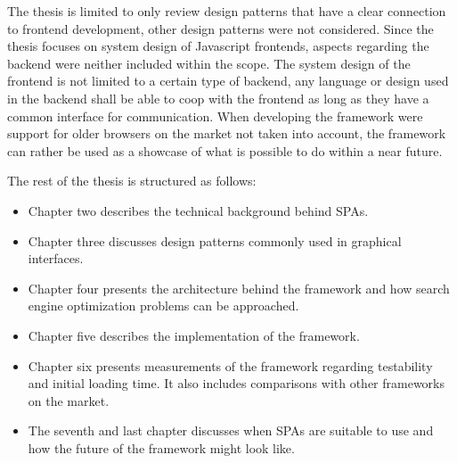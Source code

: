The thesis is limited to only review design patterns that have a clear connection to frontend development, other design patterns were not considered. Since the thesis focuses on system design of Javascript frontends, aspects regarding the backend were neither included within the scope. The system design of the frontend is not limited to a certain type of backend, any language or design used in the backend shall be able to coop with the frontend as long as they have a common interface for communication. When developing the framework were support for older browsers on the market not taken into account, the framework can rather be used as a showcase of what is possible to do within a near future.

The rest of the thesis is structured as follows:

 \begin{itemize}
	\item Chapter two describes the technical background behind SPAs.
	\item Chapter three discusses design patterns commonly used in graphical interfaces.
	\item Chapter four presents the architecture behind the framework and how search engine optimization problems can be approached.
	\item Chapter five describes the implementation of the framework.
	\item Chapter six presents measurements of the framework regarding testability and initial loading time. It also includes comparisons with other frameworks on the market.
	\item The seventh and last chapter discusses when SPAs are suitable to use and how the future of the framework might look like.

 \end{itemize}
